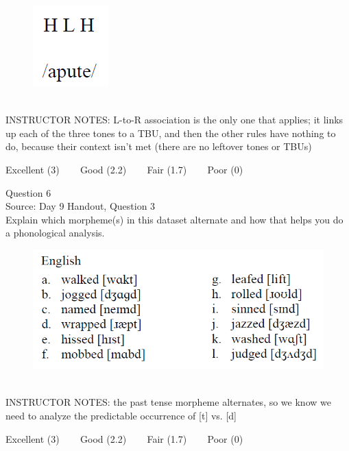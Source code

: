 \documentclass[12pt]{article}
\begin{document}
\begin{figure}[H]
\includegraphics{../images/mendetone_a.png}
\end{figure}

~\\
INSTRUCTOR NOTES: L-to-R association is the only one that applies; it links up each of the three tones to a TBU, and then the other rules have nothing to do, because their context isn't met (there are no leftover tones or TBUs)


\vfill
Excellent (3) ~~~ Good (2.2) ~~~ Fair (1.7) ~~~ Poor (0)
\newpage

{\large Question 6}\\

Source: Day 9 Handout, Question 3\\

Explain which morpheme(s) in this dataset alternate and how that helps you do a phonological analysis.\\

\begin{figure}[H]
\includegraphics{../images/english_past.png}
\end{figure}

~\\
INSTRUCTOR NOTES: the past tense morpheme alternates, so we know we need to analyze the predictable occurrence of [t] vs. [d]


\vfill
Excellent (3) ~~~ Good (2.2) ~~~ Fair (1.7) ~~~ Poor (0)
\newpage

\begin{center}
\textbf{{\color{red}{\HUGE END OF EXAM}}}\\

\end{center}
\newpage
\end{document}
